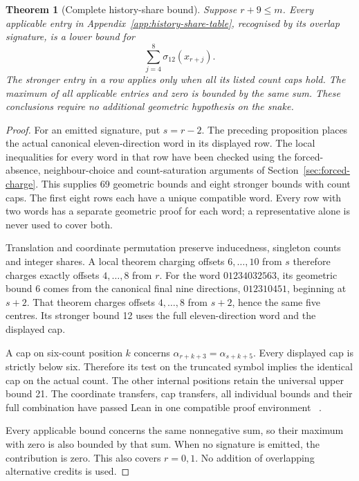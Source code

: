 \documentclass[11pt,a4paper]{article}
\newtheorem{theorem}{Theorem}[section]
\theoremstyle{definition}
\theoremstyle{remark}
\begin{document}
\begin{theorem}[Complete history-share bound]\label{thm:history-share-complete}
Suppose $r+9\le m$. Every applicable entry in
Appendix~\ref{app:history-share-table}, recognised by its overlap signature,
is a lower bound for
\[
\sum_{j=4}^{8}\sigma_{12}(x_{r+j}).
\]
The stronger entry in a row applies only when all its listed count caps hold.
The maximum of all applicable entries and zero is bounded by the same sum.
These conclusions require no additional geometric hypothesis on the snake.
\end{theorem}
\begin{proof}
For an emitted signature, put $s=r-2$. The preceding proposition places the
actual canonical eleven-direction word in its displayed row. The local
inequalities for every word in that row have been checked using the
forced-absence, neighbour-choice and count-saturation arguments of
Section~\ref{sec:forced-charge}. This supplies 69 geometric bounds and eight
stronger bounds with count caps. The first eight rows each have a unique
compatible word. Every row with two words has a separate geometric proof
for each word; a representative alone is never used to cover both.

Translation and coordinate permutation preserve inducedness, singleton
counts and integer shares. A local theorem charging offsets $6,\ldots,10$
from $s$ therefore charges exactly offsets $4,\ldots,8$ from $r$.
For the word $01234032563$, its geometric bound 6 comes from the canonical
final nine directions, $012310451$, beginning at $s+2$. That theorem charges
offsets $4,\ldots,8$ from $s+2$, hence the same five centres. Its stronger
bound 12 uses the full eleven-direction word and the displayed cap.

A cap on six-count position $k$ concerns $\alpha_{r+k+3}=
\alpha_{s+k+5}$. Every displayed cap is strictly below six. Therefore its
test on the truncated symbol implies the identical cap on the actual count.
The other internal positions retain the universal upper bound 21. The
coordinate transfers, cap transfers, all individual bounds and their full
combination have passed Lean in one compatible proof environment
~\cite{historycreditarchive}.

Every applicable bound concerns the same nonnegative sum, so their maximum
with zero is also bounded by that sum. When no signature is emitted, the
contribution is zero. This also covers $r=0,1$. No addition of overlapping
alternative credits is used.
\end{proof}
\end{document}
